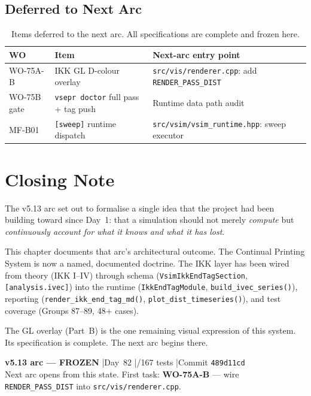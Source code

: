 \documentclass[11pt,a4paper]{article}
\theoremstyle{definition}
\begin{document}
\subsection{Deferred to Next Arc}

\begin{table}[H]
\centering\small
\begin{tabular}{@{}lll@{}}
\toprule
WO & Item & Next-arc entry point \\
\midrule
WO-75A-B
  & IKK GL D-colour overlay
  & \texttt{src/vis/renderer.cpp}: add \texttt{RENDER\_PASS\_DIST} \\
WO-75B gate
  & \texttt{vsepr doctor} full pass + tag push
  & Runtime data path audit \\
MF-B01
  & \texttt{[sweep]} runtime dispatch
  & \texttt{src/vsim/vsim\_runtime.hpp}: sweep executor \\
\bottomrule
\end{tabular}
\caption{Items deferred to the next arc. All specifications are complete and frozen here.}
\end{table}

\section*{Closing Note}


The v5.13 arc set out to formalise a single idea that the project had been
building toward since Day~1: that a simulation should not merely
\emph{compute} but \emph{continuously account for what it knows and what it
has lost}.

This chapter documents that arc's architectural outcome.  The Continual
Printing System is now a named, documented doctrine.  The IKK layer has been
wired from theory (IKK I--IV) through schema
(\texttt{VsimIkkEndTagSection}, \texttt{[analysis.ivec]}) into the runtime
(\texttt{IkkEndTagModule}, \texttt{build\_ivec\_series()}), reporting
(\texttt{render\_ikk\_end\_tag\_md()}, \texttt{plot\_dist\_timeseries()}),
and test coverage (Groups 87--89, 48$+$ cases).

The GL overlay (Part~B) is the one remaining visual expression of this
system.  Its specification is complete.  The next arc begins there.

\vspace{16pt}
\begin{mdframed}[style=freezebox]
\centering
\textbf{v5.13 arc --- FROZEN}
\quad|\quad Day~82
\quad|/167 tests
\quad|\quad Commit \texttt{489d11cd}\\[4pt]
\small
Next arc opens from this state.\quad
First task: \textbf{WO-75A-B} ---
wire \texttt{RENDER\_PASS\_DIST} into \texttt{src/vis/renderer.cpp}.
\end{mdframed}
\end{document}
